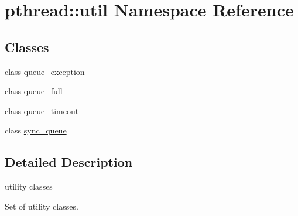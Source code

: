\hypertarget{namespacepthread_1_1util}{}\section{pthread\+:\+:util Namespace Reference}
\label{namespacepthread_1_1util}
\subsection*{Classes}
\begin{DoxyCompactItemize}
\item 
class \hyperlink{classpthread_1_1util_1_1queue__exception}{queue\+\_\+exception}
\item 
class \hyperlink{classpthread_1_1util_1_1queue__full}{queue\+\_\+full}
\item 
class \hyperlink{classpthread_1_1util_1_1queue__timeout}{queue\+\_\+timeout}
\item 
class \hyperlink{classpthread_1_1util_1_1sync__queue}{sync\+\_\+queue}
\end{DoxyCompactItemize}


\subsection{Detailed Description}
utility classes

Set of utility classes. 